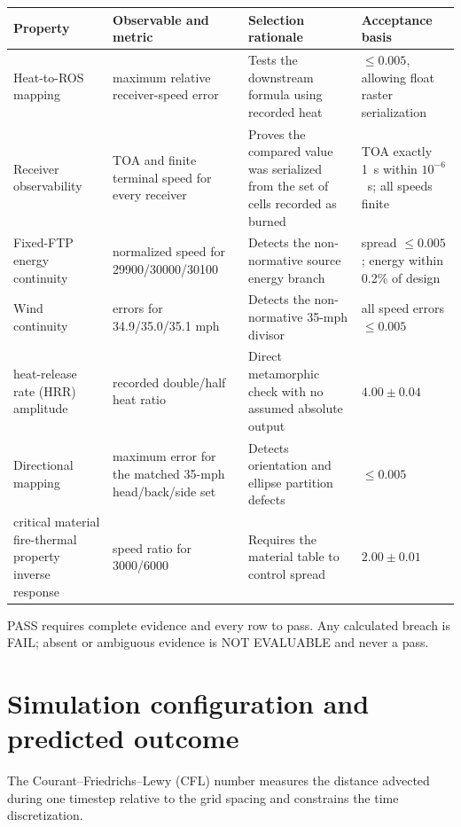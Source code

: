 \begin{center}

\begin{longtable}{@{}P{0.19\textwidth}P{0.21\textwidth}P{0.25\textwidth}P{0.24\textwidth}@{}}\toprule
Property & Observable and metric & Selection rationale & Acceptance basis\\\midrule
Heat-to-ROS mapping & maximum relative receiver-speed error & Tests the downstream formula using recorded heat & \(\leq0.005\), allowing float raster serialization\\
Receiver observability & TOA and finite terminal speed for every receiver & Proves the compared value was serialized from the set of cells recorded as burned & TOA exactly 1~s within \(10^{-6}\)~s; all speeds finite\\
Fixed-FTP energy continuity & normalized speed for 29900/30000/30100 & Detects the non-normative source energy branch & spread \(\leq0.005\); energy within 0.2\% of design\\
Wind continuity & errors for 34.9/35.0/35.1 mph & Detects the non-normative 35-mph divisor & all speed errors \(\leq0.005\)\\
heat-release rate (HRR) amplitude & recorded double/half heat ratio & Direct metamorphic check with no assumed absolute output & \(4.00\pm0.04\)\\
Directional mapping & maximum error for the matched 35-mph head/back/side set & Detects orientation and ellipse partition defects & \(\leq0.005\)\\
critical material fire-thermal property inverse response & speed ratio for 3000/6000 & Requires the material table to control spread & \(2.00\pm0.01\)\\
\bottomrule\end{longtable}
\end{center}
PASS requires complete evidence and every row to pass.  Any calculated breach is
FAIL; absent or ambiguous evidence is NOT EVALUABLE and never a pass.

\section{Simulation configuration and predicted outcome}

The Courant--Friedrichs--Lewy (CFL) number measures the distance
advected during one timestep relative to the grid spacing and
constrains the time discretization.

